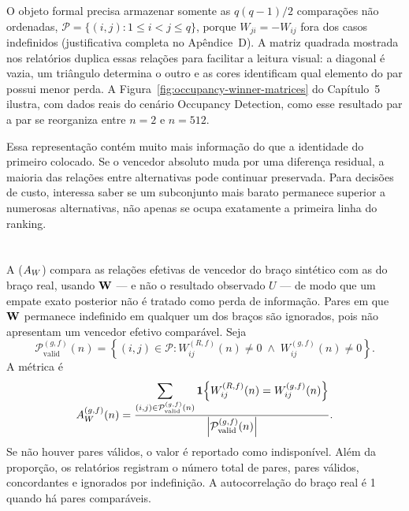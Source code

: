 O objeto formal precisa armazenar somente as $q(q-1)/2$ comparações não ordenadas, $\mathcal{P}=\{(i,j):1\leq i<j\leq q\}$, porque $W_{ji}=-W_{ij}$ fora dos casos indefinidos (justificativa completa no Apêndice~D). A matriz quadrada mostrada nos relatórios duplica essas relações para facilitar a leitura visual: a diagonal é vazia, um triângulo determina o outro e as cores identificam qual elemento do par possui menor perda. A Figura~\ref{fig:occupancy-winner-matrices} do Capítulo~5 ilustra, com dados reais do cenário Occupancy Detection, como esse resultado par a par se reorganiza entre $n=2$ e $n=512$.

Essa representação contém muito mais informação do que a identidade do primeiro colocado. Se o vencedor absoluto muda por uma diferença residual, a maioria das relações entre alternativas pode continuar preservada. Para decisões de custo, interessa saber se um subconjunto mais barato permanece superior a numerosas alternativas, não apenas se ocupa exatamente a primeira linha do ranking.

\section{\WinnersAgreement}
\label{sec:winner-agreement}

A \WinnersAgreement{} ($A_W$) compara as relações efetivas de vencedor do braço sintético com as do braço real, usando $\mathbf{W}$ --- e não o resultado observado $U$ --- de modo que um empate exato posterior não é tratado como perda de informação. Pares em que $\mathbf{W}$ permanece indefinido em qualquer um dos braços são ignorados, pois não apresentam um vencedor efetivo comparável. Seja
\begin{equation}
  \mathcal{P}_{\mathrm{valid}}^{(g,f)}(n)
  =\left\{(i,j)\in\mathcal{P}:
  W^{(R,f)}_{ij}(n)\neq0\;\land\;
  W^{(g,f)}_{ij}(n)\neq0\right\}.
\end{equation}
A métrica é
\begin{equation}
  A_W^{(g,f)}(n)=
  \frac{
    \displaystyle\sum_{(i,j)\in\mathcal{P}_{\mathrm{valid}}^{(g,f)}(n)}
    \mathbf{1}\!\left\{W^{(R,f)}_{ij}(n)=W^{(g,f)}_{ij}(n)\right\}
  }{
    \left|\mathcal{P}_{\mathrm{valid}}^{(g,f)}(n)\right|
  }.
  \label{eq:winners-agreement}
\end{equation}
Se não houver pares válidos, o valor é reportado como indisponível. Além da proporção, os relatórios registram o número total de pares, pares válidos, concordantes e ignorados por indefinição. A autocorrelação do braço real é 1 quando há pares comparáveis.

